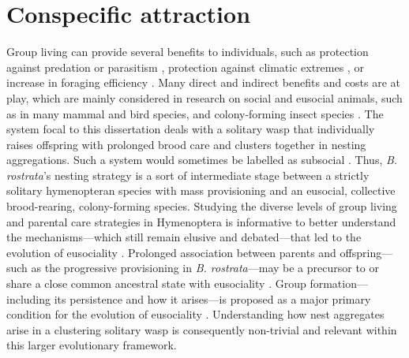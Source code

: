 \documentclass[10pt, twoside]{book} %
\begin{document}
	\section{Conspecific attraction}\label{conspattr}
	Group living can provide several benefits to individuals, such as protection against predation or parasitism \citep{hamilton1971, mooring1992}, protection against climatic extremes \citep{gilbert2008}, or increase in foraging efficiency \citep{clark1986}. Many direct and indirect benefits and costs are at play, which are mainly considered in research on social and eusocial animals, such as in many mammal and bird species, and colony-forming insect species \citep{ross1995, kingma2018, crisp2021}. The system focal to this dissertation deals with a solitary wasp that individually raises offspring with prolonged brood care and clusters together in nesting aggregations. Such a system would sometimes be labelled as subsocial \citep{field2020}. Thus, \textit{B. rostrata}'s nesting strategy is a sort of intermediate stage between a strictly solitary hymenopteran species with mass provisioning and an eusocial, collective brood-rearing, colony-forming species. Studying the diverse levels of group living and parental care strategies in Hymenoptera is informative to better understand the mechanisms---which still remain elusive and debated---that led to the evolution of eusociality \citep{foster2006, polidori2006, hughes2008, nowak2010, field2020}. Prolonged association between parents and offspring---such as the progressive provisioning in \textit{B. rostrata}---may be a precursor to or share a close common ancestral state with eusociality \citep{field2020}. Group formation---including its persistence and how it arises---is proposed as a major primary condition for the evolution of eusociality \citep{nowak2010}. Understanding how nest aggregates arise in a clustering solitary wasp is consequently non-trivial and relevant within this larger evolutionary framework.\\
	
\end{document}
